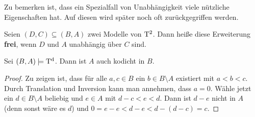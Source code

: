 Zu bemerken ist, dass ein Spezialfall von Unabhängigkeit viele nützliche Eigenschaften hat. Auf diesen wird später noch oft zurückgegriffen werden.
\begin{definition}
	Seien $(D,C)\subseteq(B,A)$ zwei Modelle von $\operatorname{T^2}$. Dann heiße diese Erweiterung \textbf{frei}, wenn $D$ und $A$ unabhängig über $C$ sind.
\end{definition}

\begin{lemma}
	Sei $(B,A)\models\operatorname{T^d}$. Dann ist $A$ auch kodicht in $B$.
\end{lemma}
\begin{proof}
	Zu zeigen ist, dass für alle $a,c\in B$ ein $b\in B\setminus A$ existiert mit $a<b<c$. Durch Translation und Inversion kann man annehmen, dass $a=0$. Wähle jetzt ein $d\in B\setminus A$ beliebig und $e\in A$ mit $d-c<e<d$. Dann ist $d-e$ nicht in $A$ (denn sonst wäre es $d$) und $0=e-e<d-e<d-(d-c)=c$.
\end{proof}


